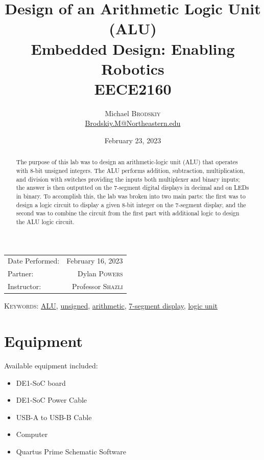 \documentclass[
	letterpaper, %
	10pt, %
]{CSUniSchoolLabReport}
\title{Design of an Arithmetic Logic Unit (ALU) \\ Embedded Design: Enabling Robotics \\ EECE2160} %
\author{Michael \textsc{Brodskiy}\\ \small \href{mailto:Brodskiy.M@Northeastern.edu}{Brodskiy.M@Northeastern.edu}}
\date{February 23, 2023} %
\begin{document}
\maketitle %

\begin{center}
	\begin{tabular}{l r}
		Date Performed: & February 16, 2023 \\ %
        Partner: & Dylan \textsc{Powers} \\ %
		Instructor: & Professor \textsc{Shazli} %
	\end{tabular}
\end{center}

\newpage

\begin{abstract}

  The purpose of this lab was to design an arithmetic-logic unit (ALU) that operates with 8-bit unsigned integers. The ALU performs addition, subtraction, multiplication, and division with switches providing the inputs both multiplexer and binary inputs; the answer is then outputted on the 7-segment digital displays in decimal and on LEDs in binary. To accomplish this, the lab was broken into two main parts: the first was to design a logic circuit to display a given 8-bit integer on the 7-segment display, and the second was to combine the circuit from the first part with additional logic to design the ALU logic circuit. 

\end{abstract}

\begin{flushleft}

  \textsc{Keywords:} \underline{ALU}, \underline{unsigned}, \underline{arithmetic}, \underline{7-segment display}, \underline{logic unit}

\end{flushleft}

\newpage

\section{Equipment}

\hspace{.5 in} Available equipment included:\\

\begin{itemize}

  \item DE1-SoC board

  \item DE1-SoC Power Cable

  \item USB-A to USB-B Cable

  \item Computer

  \item Quartus Prime Schematic Software

\end{itemize}
\end{document}
